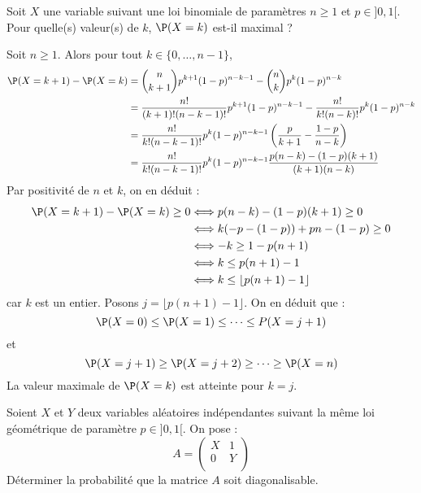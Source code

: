 \documentclass[a4paper,10pt]{report}
\begin{document}
\begin{Exercice}{} Soit $X$ une variable suivant une loi binomiale de paramètres $n \geq 1$ et $p \in ]0,1[$. Pour quelle(s) valeur(s) de $k$, $\P(X=k)$ est-il maximal ?
\end{Exercice}

\corr Soit $n \geq 1$. Alors pour tout $k \in \lbrace 0, \ldots, n-1\rbrace$,
\begin{align*}
\P(X=k+1)- \P(X=k) & = \binom{n}{k+1} p^{k+1} (1-p)^{n-k-1} - \binom{n}{k} p^{k} (1-p)^{n-k} \\
& = \dfrac{n!}{(k+1)!(n-k-1)!} p^{k+1} (1-p)^{n-k-1} - \dfrac{n!}{k!(n-k)!}  p^{k} (1-p)^{n-k} \\
& = \dfrac{n!}{k! (n-k-1)!} p^k(1-p)^{n-k-1} \left( \dfrac{p}{k+1} - \dfrac{1-p}{n-k} \right) \\
& =  \dfrac{n!}{k! (n-k-1)!} p^k(1-p)^{n-k-1} \dfrac{p(n-k)- (1-p)(k+1)}{(k+1)(n-k)}
\end{align*}
Par positivité de $n$ et $k$, on en déduit :
\begin{align*}
\P(X=k+1)- \P(X=k) \geq 0 & \Longleftrightarrow p(n-k)- (1-p)(k+1) \geq 0 \\
& \Longleftrightarrow k (-p-(1-p)) + pn -(1-p) \geq 0 \\
& \Longleftrightarrow -k \geq 1-p(n+1) \\
& \Longleftrightarrow k \leq p(n+1)-1 \\
& \Longleftrightarrow k \leq \lfloor  p(n+1)-1 \rfloor
\end{align*}
car $k$ est un entier. Posons $j= \lfloor  p(n+1)-1 \rfloor$. On en déduit que :
$$ \P(X=0) \leq \P(X=1) \leq \cdots \leq P(X=j+1)$$
et 
$$ \P(X=j+1) \geq \P(X=j+2) \geq \cdots \geq \P(X=n)$$
La valeur maximale de $\P(X=k)$ est atteinte pour $k=j$.

\begin{Exercice}{} Soient $X$ et $Y$ deux variables aléatoires indépendantes suivant la même loi géométrique de paramètre $p \in ]0,1[$. On pose :
$$ A = \begin{pmatrix}
X & 1 \\
0 & Y \\
\end{pmatrix}$$
Déterminer la probabilité que la matrice $A$ soit diagonalisable.
\end{Exercice} 
\end{document}
